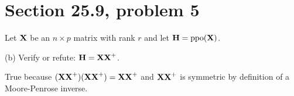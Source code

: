 \section{Section 25.9, problem 5}
Let $\bf X$ be an $n\times p$ matrix with rank $r$ and let
${\bf H}=\mathop{\rm ppo}({\bf X})$.

\bigskip
\noindent
(b) Verify or refute: ${\bf H}={\bf XX}^+$.

\bigskip
\noindent
True because $({\bf XX}^+)({\bf XX}^+)={\bf XX}^+$ and
${\bf XX}^+$ is symmetric by definition of a Moore-Penrose inverse.
